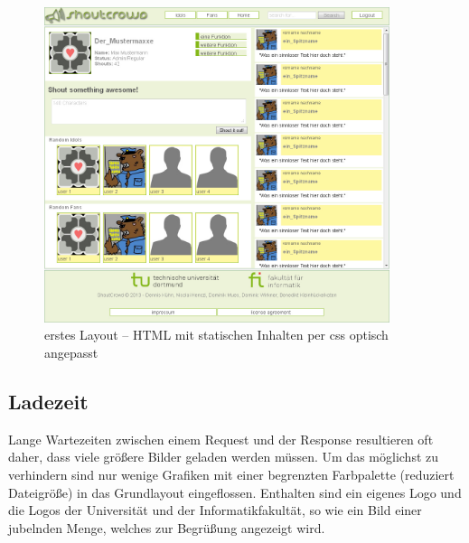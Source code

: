 \begin{figure}[h!]
\begin{center}
\includegraphics[width=0.9\textwidth]{first.jpg}
\caption{erstes Layout -- HTML mit statischen Inhalten per css optisch angepasst}
\end{center}
\end{figure}

\subsection*{Ladezeit}
Lange Wartezeiten zwischen einem Request und der Response resultieren oft daher, dass viele größere Bilder geladen werden müssen. Um das möglichst zu verhindern sind nur wenige Grafiken mit einer begrenzten Farbpalette (reduziert Dateigröße) in das Grundlayout eingeflossen. Enthalten sind ein eigenes Logo und die Logos der Universität und der Informatikfakultät, so wie ein Bild einer jubelnden Menge, welches zur Begrüßung angezeigt wird.

